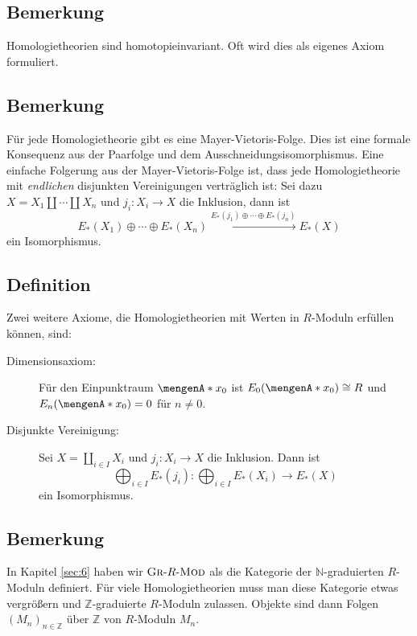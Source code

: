 \subsection[Bemerkung zur Homotopieinvarianz von Homologietheorien]{Bemerkung} %
\label{sub:143}
Homologietheorien sind homotopieinvariant. Oft wird dies als eigenes Axiom formuliert.

\subsection[Bemerkung zu Mayer-Vietoris-Folge und disjunkten Vereinigungen]{Bemerkung} %
\label{sub:144}
Für jede Homologietheorie gibt es eine Mayer-Vietoris-Folge. Dies ist eine formale Konsequenz aus der Paarfolge und dem Ausschneidungsisomorphismus. Eine einfache Folgerung 
aus der Mayer-Vietoris-Folge ist, dass jede Homologietheorie mit \emph{endlichen} disjunkten Vereinigungen verträglich ist: Sei dazu $X= X_1 \amalg \cdots \amalg X_n$ und
$j_i \colon X_i \to X$ die Inklusion, dann ist 
\[
	E_*(X_1) \oplus \cdots \oplus E_*(X_n) \xrightarrow{E_*(j_1) \oplus \cdots \oplus E_*(j_n)} E_*(X)
\]
ein Isomorphismus.

\subsection[Definition: Dimensionsaxiom und Axiom über disjunkte Vereinigungen]{Definition} %
\label{sub:145}
Zwei weitere Axiome, die Homologietheorien mit Werten in $R$-Moduln erfüllen können, sind:
\begin{description}
	\item[Dimensionsaxiom:] Für den Einpunktraum $\set{x_0}$ ist $E_0(\set{x_0})\cong R$ und $E_n(\set{x_0})=0$ für $n \not=0$.
	\item[Disjunkte Vereinigung:]  Sei $X = \coprod_{i \in I} X_i$ und $j_i \colon X_i \to X$ die Inklusion. Dann ist 
	\[
		\bigoplus_{i \in I} E_*(j_i) \colon \bigoplus_{i \in I} E_*(X_i) \longrightarrow E_*(X)
	\]
	ein Isomorphismus.
\end{description}

\subsection[Bemerkung: Statt $\mathds{N}$-graduierten Moduln sind oft auch $\mathds{Z}$-graduierte Moduln nötig]{Bemerkung} %
\label{sub:146}
In Kapitel \ref{sec:6} haben wir $\textsc{Gr}\text{-}R\text{-}\textsc{Mod}$ als die Kategorie der $\mathds{N}$-graduierten $R$-Moduln definiert. Für viele Homologietheorien muss man
diese Kategorie etwas vergrößern und $\mathds{Z}$-graduierte $R$-Moduln zulassen. Objekte sind dann Folgen $(M_n)_{n \in \mathds{Z}}$ über $\mathds{Z}$ von $R$-Moduln $M_n$.

